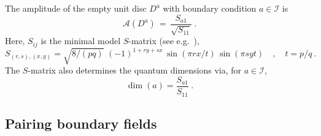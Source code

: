 \documentclass[11pt,a4paper]{article}
\numberwithin{equation}{section}
\begin{document}
\smallskip
The amplitude of the empty unit disc $D^a$ with boundary condition $a \in \mathcal{I}$ is
%
\begin{equation}\label{eq:discA}
    \mathcal{A}(D^a) \,=\, \frac{S_{a1}}{\sqrt{S_{11}}} \ .
\end{equation}
%
Here, $S_{ij}$ is the minimal model $S$-matrix (see e.g.\ \cite[\S\,10.6]{DiFrancesco:1997nk}),
%
\begin{equation}\label{eq:min-mod-Smatrix}
  S_{(r,s),(x,y)} = \sqrt{8/(pq)} \,\, (-1)^{1+ry+sx} \,
  \sin( \pi r x /t) \, \sin( \pi s y t) 
  \quad , \quad t = p/q \ .
\end{equation}
The $S$-matrix also determines the quantum dimensions via, for $a \in \mathcal{I}$,
\begin{equation}
    \dim(a) = \frac{S_{a1}}{S_{11}} \ .
\end{equation}

\subsection{Pairing boundary fields}
\end{document}
